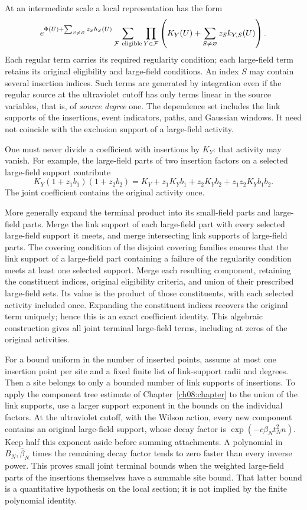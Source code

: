 At an intermediate scale a local representation has the form
\begin{equation}
 e^{\Phi(U)+\sum_{S\ne\varnothing}z_S h_S(U)}
 \sum_{\mathcal F\ {\rm eligible}}
       \prod_{Y\in\mathcal F}
          \left(K_Y(U)+\sum_{S\ne\varnothing}z_S k_{Y,S}(U)\right).
 \label{ch11:local-source}
\end{equation}
Each regular term carries its required regularity condition;
each large-field term retains its original eligibility and large-field conditions.
An index $S$ may contain several insertion indices. Such terms are
generated by integration even if the regular source at the ultraviolet cutoff has only
terms linear in the source variables, that is, of \emph{source degree} one. The dependence set includes the link supports of the
insertions, event indicators, paths, and Gaussian windows. It need not coincide
with the exclusion support of a large-field activity.

One must never divide a coefficient with insertions by $K_Y$: that activity may
vanish. For example, the large-field parts of two insertion factors on a selected
large-field support contribute
\[
 K_Y(1+z_1b_1)(1+z_2b_2)
 =K_Y+z_1K_Yb_1+z_2K_Yb_2+z_1z_2K_Yb_1b_2.
\]
The joint coefficient contains the original activity once.

More generally expand the terminal product into its small-field
parts and large-field parts. Merge the link support of each large-field part with
every selected large-field support it meets, and merge intersecting
link supports of large-field parts. The covering condition of the disjoint covering families ensures that the link support of a large-field part
containing a failure of the regularity condition meets at least one selected support.
Merge each resulting component, retaining the constituent indices,
original eligibility criteria, and union of their prescribed large-field sets.
Its value is the product of those constituents, with each selected
activity included once. Expanding the constituent indices recovers
the original term uniquely; hence this is an exact coefficient identity.
This algebraic construction gives all joint terminal large-field terms,
including at zeros of the original activities.

For a bound uniform in the number of inserted points, assume at most one
insertion point per site and a fixed finite list of link-support radii and
degrees. Then a site belongs to only a bounded number of link supports of
insertions. To apply the component tree estimate of Chapter~\ref{ch08:chapter}
to the union of the link supports, use a larger support exponent in the
bounds on the individual factors.
At the ultraviolet cutoff, with the Wilson action, every new component contains an original
large-field support, whose decay factor is
$\exp(-c\beta_Nt_N^2 n)$. Keep half this exponent aside before summing
attachments. A polynomial in $B_N,\widehat\beta_N$ times the remaining
decay factor tends to zero faster than every inverse power.
This proves small joint terminal bounds when the weighted large-field
parts of the insertions themselves have a summable site bound. That latter bound
is a quantitative hypothesis on the local section; it is not implied by the
finite polynomial identity.

